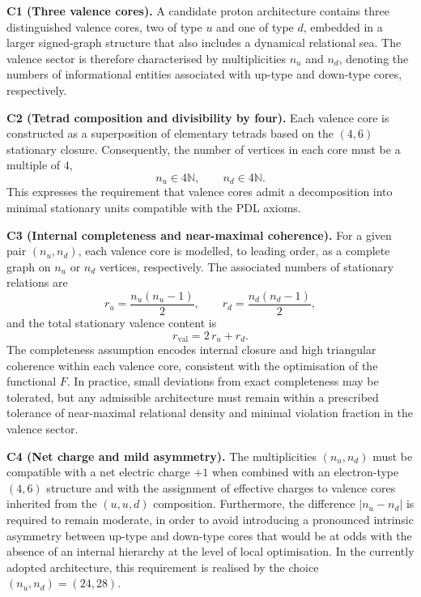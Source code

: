 \documentclass[11pt,a4paper]{article}
\begin{document}
\medskip
\noindent\textbf{C1 (Three valence cores).} A candidate proton architecture contains three distinguished valence cores, two of type $u$ and one of type $d$, embedded in a larger signed-graph structure that also includes a dynamical relational sea. The valence sector is therefore characterised by multiplicities $n_u$ and $n_d$, denoting the numbers of informational entities associated with up-type and down-type cores, respectively.

\medskip
\noindent\textbf{C2 (Tetrad composition and divisibility by four).} Each valence core is constructed as a superposition of elementary tetrads based on the $(4,6)$ stationary closure. Consequently, the number of vertices in each core must be a multiple of $4$,
\begin{equation}
n_u \in 4\mathbb{N},\qquad n_d \in 4\mathbb{N}.
\end{equation}
This expresses the requirement that valence cores admit a decomposition into minimal stationary units compatible with the PDL axioms.\cite{LaubscherIntroPDL2026,LaubscherPDLFull2026}

\medskip
\noindent\textbf{C3 (Internal completeness and near-maximal coherence).} For a given pair $(n_u,n_d)$, each valence core is modelled, to leading order, as a complete graph on $n_u$ or $n_d$ vertices, respectively. The associated numbers of stationary relations are
\begin{equation}
r_u = \frac{n_u(n_u-1)}{2},\qquad r_d = \frac{n_d(n_d-1)}{2},
\end{equation}
and the total stationary valence content is
\begin{equation}
r_{\mathrm{val}} = 2\,r_u + r_d.
\end{equation}
The completeness assumption encodes internal closure and high triangular coherence within each valence core, consistent with the optimisation of the functional $F$.\cite{LaubscherPDLFull2026,LaubscherLDP2026} In practice, small deviations from exact completeness may be tolerated, but any admissible architecture must remain within a prescribed tolerance of near-maximal relational density and minimal violation fraction in the valence sector.

\medskip
\noindent\textbf{C4 (Net charge and mild asymmetry).} The multiplicities $(n_u,n_d)$ must be compatible with a net electric charge $+1$ when combined with an electron-type $(4,6)$ structure and with the assignment of effective charges to valence cores inherited from the $(u,u,d)$ composition. Furthermore, the difference $|n_u-n_d|$ is required to remain moderate, in order to avoid introducing a pronounced intrinsic asymmetry between up-type and down-type cores that would be at odds with the absence of an internal hierarchy at the level of local optimisation.\cite{LaubscherLDP2026,LaubscherIMRadPDL2026} In the currently adopted architecture, this requirement is realised by the choice $(n_u,n_d)=(24,28)$.
\end{document}
